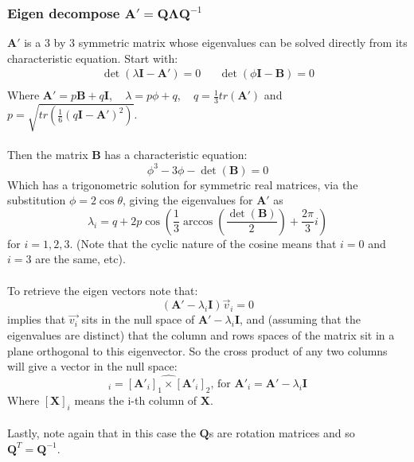 \documentclass{article}
\def\mat#1{\mathbf{#1}}
\begin{document}
\subsubsection{Eigen decompose $\mat{A'} = \mat{Q}\mat{\Lambda}\mat{Q}^{-1}$}
$\mat{A'}$ is a 3 by 3 symmetric matrix whose eigenvalues can be
solved directly from its characteristic equation. Start with:
\begin{equation}
\begin{matrix}
\det\left( \lambda \mat{I} - \mat{A'} \right) = 0 & &
\det\left( \phi \mat{I} - \mat{B} \right) = 0\\
\end{matrix}
\end{equation}
Where $\mat{A'} = p\mat{B} + q\mat{I}$, ~ $\lambda = p \phi + q$, ~ $q = \frac{1}{3}tr(\mat{A'})$ and 
$p = \sqrt{ tr \left( \frac{1}{6} (q\mat{I}-\mat{A'})^2 \right) } $.\\
\\
Then the matrix $\mat{B}$ has a characteristic equation:
\begin{equation}
\phi^3 - 3 \phi - \det(\mat{B}) = 0
\end{equation}
Which has a trigonometric solution for symmetric real matrices, via the 
substitution $\phi = 2 \cos{ \theta }$, giving the eigenvalues for $\mat{A'}$ as
\begin{equation}
\lambda_{i} = q + 2 p \cos{(\frac{1}{3}\arccos{ \left( \frac{ \det(\mat{B})}{2} \right) + \frac{2\pi}{3}i })}
\end{equation}
for $i=1,2,3$. (Note that the cyclic nature of the cosine means that $i=0$ and $i=3$ are the same, etc).
\\
\\
To retrieve the eigen vectors note that: 
\begin{equation}
(\mat{A'}-\lambda_i\mat{I})\vec{v}_i = 0
\end{equation}
implies that $\vec{v_i}$ sits in the null space of
$\mat{A'}-\lambda_i\mat{I}$, and (assuming that the eigenvalues are
distinct) that the column and rows spaces of the matrix sit in a
plane orthogonal to this eigenvector. So the cross product of any two
columns will give a vector in the null space:
\begin{equation}
[\mat{Q}]_i = \widehat{ [\mat{A'}_i]_1 \times  [\mat{A'}_i]_2 }\text{, for } \mat{A'}_i = \mat{A'} - \lambda_i\mat{I}
\end{equation}
Where $[\mat{X}]_i$ means the i-th column of $\mat{X}$.\\
\\
Lastly, note again that in this case the $\mat{Q}$s are rotation matrices and so $\mat{Q}^T = \mat{Q}^{-1}$.
\end{document}
